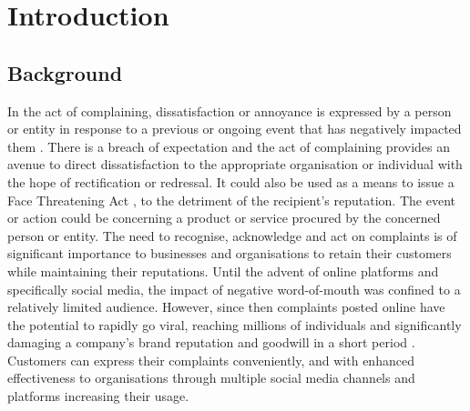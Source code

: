 \chapter{Introduction}

\section{Background}
In the act of complaining, dissatisfaction or annoyance is expressed by a person or entity in response to a previous or ongoing event that has negatively impacted them \cite{olshtain_speechact_1987}. There is a breach of expectation and the act of complaining provides an avenue to direct dissatisfaction to the appropriate organisation or individual with the hope of rectification or redressal. It could also be used as a means to issue a Face Threatening Act \cite{brownPolitenessUniversalsLanguage1987}, to the detriment of the recipient's reputation. The event or action could be concerning a product or service procured by the concerned person or entity. The need to recognise, acknowledge and act on complaints is of significant importance to businesses and organisations to retain their customers while maintaining their reputations.
\newline \newline
Until the advent of online platforms and specifically social media, the impact of negative word-of-mouth was confined to a relatively limited audience. However, since then complaints posted online have the potential to rapidly go viral, reaching millions of individuals and significantly damaging a company's brand reputation and goodwill in a short period \cite{tripp_when_2011}. Customers can express their complaints conveniently, and with enhanced effectiveness to organisations through multiple social media channels and platforms increasing their usage\cite{balaji_customer_2015}.\newline


